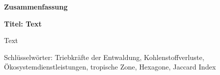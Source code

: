 \thispagestyle{empty}

\begin{de}
	\begin{center}
		\textbf{Zusammenfassung}
	\end{center}
	\textbf{Titel: Text}
	
	Text
	
	Schlüsselwörter: Triebkräfte der Entwaldung, Kohlenstoffverluste, Ökosystemdienstleistungen, tropische Zone, Hexagone, Jaccard Index
\end{de}